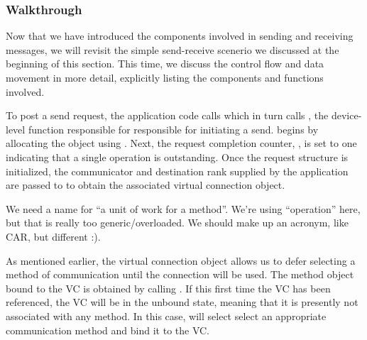 
\subsubsection{Walkthrough}
\label{sssec:walkthrough}


Now that we have introduced the components involved in sending and receiving
messages, we will revisit the simple send-receive scenerio we discussed at the
beginning of this section.  This time, we discuss the control flow and data
movement in more detail, explicitly listing the components and functions
involved.


To post a send request, the application code calls  which in
turn calls , the device-level function responsible for
responsible for initiating a send.   begins by allocating the
 object using .  Next, the
request completion counter, , is set to one indicating
that a single operation is outstanding.  Once the request structure is
initialized, the communicator and destination rank supplied by the application
are passed to  to obtain the associated virtual
connection object.

\begin{cmt}
  We need a name for ``a unit of work for a method''.  We're using
  ``operation'' here, but that is really too generic/overloaded.  We should
  make up an acronym, like CAR, but different :).
\end{cmt}

As mentioned earlier, the virtual connection object allows us to defer
selecting a method of communication until the connection will be used.  The
method object bound to the VC is obtained by calling
.  If this first time the VC has been referenced,
the VC will be in the unbound state, meaning that it is presently not
associated with any method.  In this case,  will
select select an appropriate communication method and bind it to the VC.

